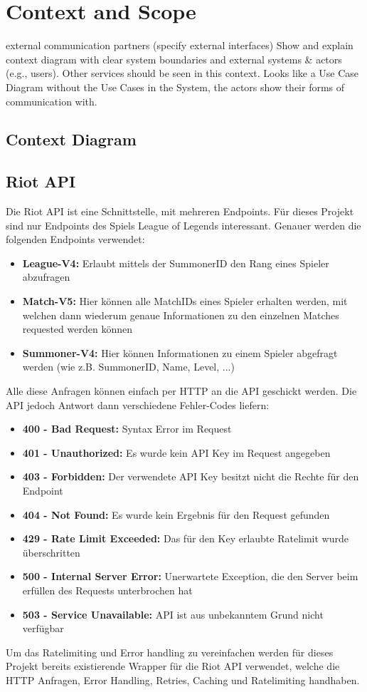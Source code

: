 \section{Context and Scope}
external communication partners (specify external interfaces)
Show and explain context diagram with clear system boundaries and external systems \& actors (e.g., users). Other services should be seen in this context. Looks like a Use Case Diagram without the Use Cases in the System, the actors show their forms of communication with.

\subsection{Context Diagram}

\subsection{Riot API}\label{riot-api-libraries}
Die Riot API ist eine Schnittstelle, mit mehreren Endpoints. Für dieses Projekt sind nur Endpoints des Spiels League of Legends interessant. Genauer werden die folgenden Endpoints verwendet:
\begin{itemize}
\item \textbf{League-V4:} Erlaubt mittels der SummonerID den Rang eines Spieler abzufragen
\item \textbf{Match-V5:} Hier können alle MatchIDs eines Spieler erhalten werden, mit welchen dann wiederum genaue Informationen zu den einzelnen Matches requested werden können
\item \textbf{Summoner-V4:} Hier können Informationen zu einem Spieler abgefragt werden (wie z.B. SummonerID, Name, Level, ...)
\end{itemize}
Alle diese Anfragen können einfach per HTTP an die API geschickt werden. Die API jedoch Antwort dann verschiedene Fehler-Codes liefern:
\begin{itemize}
\item \textbf{400 - Bad Request:} Syntax Error im Request
\item \textbf{401 - Unauthorized:} Es wurde kein API Key im Request angegeben
\item \textbf{403 - Forbidden:} Der verwendete API Key besitzt nicht die Rechte für den Endpoint
\item \textbf{404 - Not Found:} Es wurde kein Ergebnis für den Request gefunden
\item \textbf{429 - Rate Limit Exceeded:} Das für den Key erlaubte Ratelimit wurde überschritten
\item \textbf{500 - Internal Server Error:} Unerwartete Exception, die den Server beim erfüllen des Requests unterbrochen hat
\item \textbf{503 - Service Unavailable:} API ist aus unbekanntem Grund nicht verfügbar 
\end{itemize}
Um das Ratelimiting und Error handling zu vereinfachen werden für dieses Projekt bereits existierende Wrapper für die Riot API verwendet, welche die HTTP Anfragen, Error Handling, Retries, Caching und Ratelimiting handhaben.
